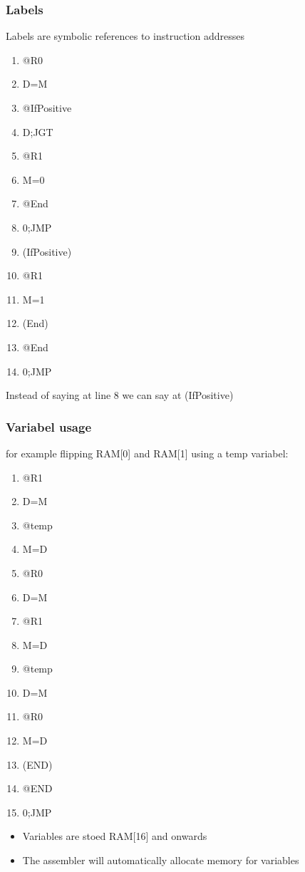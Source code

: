 \documentclass[12pt,a4paper]{article}
\begin{document}
\subsubsection{Labels}
Labels are symbolic references to instruction addresses
\begin{enumerate}
    \item @R0
    \item D=M
    \item @IfPositive
    \item D;JGT
    \item @R1
    \item M=0
    \item @End
    \item 0;JMP
    \item (IfPositive)
    \item @R1
    \item M=1
    \item (End)
    \item @End
    \item 0;JMP
\end{enumerate}
Instead of saying at line 8 we can say at (IfPositive)

\subsubsection{Variabel usage}
for example flipping RAM[0] and RAM[1] using a temp variabel:
\begin{enumerate}
    \item @R1
    \item D=M
    \item @temp
    \item M=D
    \item @R0
    \item D=M
    \item @R1
    \item M=D
    \item @temp
    \item D=M
    \item @R0
    \item M=D
    \item (END)
    \item @END
    \item 0;JMP   
\end{enumerate}
\begin{itemize}
    \item Variables are stoed RAM[16] and onwards
    \item The assembler will automatically allocate memory for variables
\end{itemize}
\end{document}
